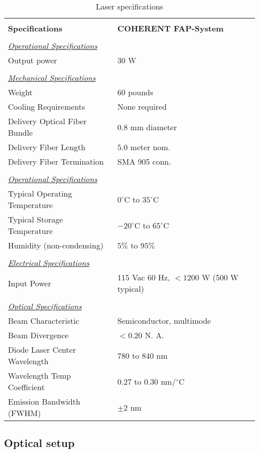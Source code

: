 \begin{table}
\begin{center}
\begin{tabular}{|l|l|}
\hline
& \\
{\bf Specifications}&{\bf COHERENT FAP-System} \\
\hline
& \\
\underline {\it Operational Specifications}& \\
Output power			& 30 W \\
& \\
\underline {\it Mechanical Specifications}& \\
Weight			        & 60 pounds  \\
Cooling Requirements 		& None required \\
Delivery Optical Fiber Bundle   & 0.8 mm diameter \\
Delivery Fiber Length		& 5.0 meter nom.\\
Delivery Fiber Termination	& SMA 905 conn. \\
& \\
\underline {\it Operational Specifications}& \\
Typical Operating Temperature   & $0^\circ$C to $35^\circ$C \\
Typical Storage Temperature     & $-20^\circ$C to $65^\circ$C \\
Humidity (non-condensing)       & $5\%$ to $95\%$  \\
& \\
\underline {\it Electrical Specifications}& \\
Input Power	                & 115 Vac 60 Hz, $<1200$ W (500 W typical) \\
& \\
\underline {\it Optical Specifications}& \\
Beam Characteristic 		& Semiconductor, multimode \\
Beam Divergence        & $<0.20$ N. A. \\
Diode Laser Center Wavelength   & 780 to 840 nm \\
Wavelength Temp Coefficient	& 0.27 to 0.30 nm/$^\circ$C \\
Emission Bandwidth (FWHM)       & $\pm 2$ nm \\
\hline
\end{tabular}
\label{speclaser}
\caption{Laser specifications}
\end{center}
\end{table}


\subsection{Optical setup}

